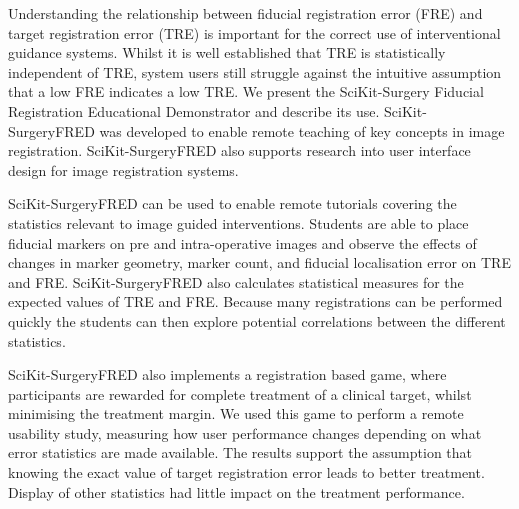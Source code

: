 Understanding the relationship between fiducial registration error (FRE) and target registration error (TRE) is important for the correct use of interventional guidance systems. Whilst it is well established that TRE is statistically independent of TRE, system users still struggle against the intuitive assumption that a low FRE indicates a low TRE. We present the SciKit-Surgery Fiducial Registration Educational Demonstrator and describe its use. SciKit-SurgeryFRED was developed to enable remote teaching of key concepts in image registration. SciKit-SurgeryFRED also supports research into user interface design for image registration systems. 

SciKit-SurgeryFRED can be used to enable remote tutorials covering the statistics relevant to image guided interventions. Students are able to place fiducial markers on pre and intra-operative images and observe the effects of changes in marker geometry, marker count, and fiducial localisation error on TRE and FRE. SciKit-SurgeryFRED also calculates statistical measures for the expected values of TRE and FRE. Because many registrations can be performed quickly the students can then explore potential correlations between the different statistics. 

SciKit-SurgeryFRED also implements a registration based game, where participants are rewarded for complete treatment of a clinical target, whilst minimising the treatment margin. We used this game to perform a remote usability study, measuring how user performance changes depending on what error statistics are made available. The results support the assumption that knowing the exact value of target registration error leads to better treatment. Display of other statistics had little impact on the treatment performance.  
